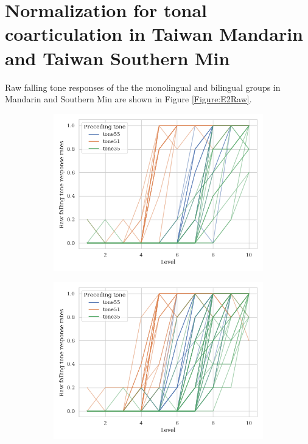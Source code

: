 \section{Normalization for tonal coarticulation in Taiwan Mandarin and Taiwan Southern Min}
Raw falling tone responses of the the monolingual and bilingual groups in Mandarin and Southern Min are shown in Figure \ref{Figure:E2Raw}.

\begin{figure}[hbt!]
\centering
\begin{subfigure}[b]{.45\textwidth}
\centering
\includegraphics[width=\textwidth]{figures/E2/Mandarin_monolingual_E2_raw.png}
\end{subfigure}
\hfill
\begin{subfigure}[b]{.45\textwidth}
\centering
\includegraphics[width=\textwidth]{figures/E2/Mandarin_bilingual_E2_raw.png}

\end{subfigure}
\end{figure}
